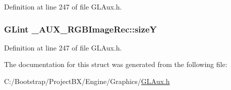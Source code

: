 Definition at line 247 of file GLAux.h.\hypertarget{struct___a_u_x___r_g_b_image_rec_bddf60a63d1c85d73e1312f49d7b8f70}{
\subsubsection[{sizeY}]{\setlength{\rightskip}{0pt plus 5cm}GLint {\bf \_\-AUX\_\-RGBImageRec::sizeY}}}
\label{struct___a_u_x___r_g_b_image_rec_bddf60a63d1c85d73e1312f49d7b8f70}




Definition at line 247 of file GLAux.h.

The documentation for this struct was generated from the following file:\begin{CompactItemize}
\item 
C:/Bootstrap/ProjectBX/Engine/Graphics/\hyperlink{_g_l_aux_8h}{GLAux.h}\end{CompactItemize}
